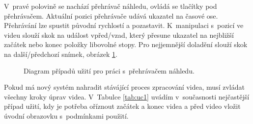 V~pravé polovině se nachází přehrávač náhledu, ovládá se tlačítky pod přehrávačem. Aktuální pozici přehrávače udává ukazatel na časové ose. Přehrávání lze spustit původní rychlostí a pozastavit. K~manipulaci s~pozicí ve videu slouží skok na událost vpřed/vzad, který přesune ukazatel na nejbližší začátek nebo konec položky libovolné stopy. Pro nejjemnější doladění slouží skok na další/předchozí snímek, obrázek \ref{img:ucd-prehravac}.
\begin{figure}[!h]
	\centering
	\caption{Diagram případů užití pro práci s~přehrávačem náhledu.}\label{img:ucd-prehravac}
\end{figure}

Pokud má nový systém nahradit stávájící proces zpracování videa, musí zvládat všechny kroky úprav videa. V~Tabulce \ref{tab:uc1} uvádím v~současnosti nejčastější případ užití, kdy je potřeba oříznout začátek a konec videa a před video vložit úvodní obrazovku s~podmínkami použití.

